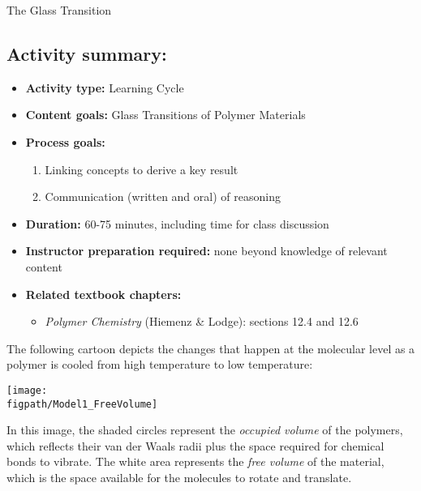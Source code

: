 \begin{activity}{The Glass Transition}
\begin{instructornotes}
	\subsection*{Activity summary:}
	\begin{itemize}
		\item \textbf{Activity type:} Learning Cycle
		\item \textbf{Content goals:} Glass Transitions of Polymer Materials
		\item \textbf{Process goals:} %
			\begin{enumerate}
				\item Linking concepts to derive a key result
				\item Communication (written and oral) of reasoning
			\end{enumerate}
		\item \textbf{Duration:} 60-75 minutes, including time for class discussion
		\item \textbf{Instructor preparation required:} none beyond knowledge of relevant content
		\item \textbf{Related textbook chapters:}
			\begin{itemize}
				\item \emph{Polymer Chemistry} (Hiemenz \& Lodge): sections 12.4 and 12.6
			\end{itemize}
	\end{itemize}
	
\end{instructornotes}


\begin{model}
	\label{\labelbase:mdl:freevolume}
	
	The following cartoon depicts the changes that happen at the molecular level as a polymer is cooled from high temperature to low temperature:
	
	\centerline{\texttt{[image: \\figpath/Model1\_FreeVolume]}}
	
	In this image, the shaded circles represent the \textit{occupied volume} of the polymers, which reflects their van der Waals radii plus the space required for chemical bonds to vibrate.  The white area represents the \emph{free volume} of the material, which is the space available for the molecules to rotate and translate.
	

\end{model}
\end{activity}
